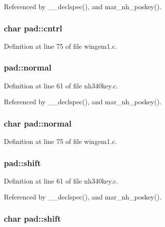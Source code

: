 Referenced by \+\_\+\+\_\+declspec(), and mar\+\_\+nh\+\_\+poskey().

\hypertarget{structpad_a40e6032da3145f7bcf936a79afeb8f43}{
\subsubsection[{cntrl}]{\setlength{\rightskip}{0pt plus 5cm}char pad\+::cntrl}}\label{structpad_a40e6032da3145f7bcf936a79afeb8f43}


Definition at line 75 of file wingem1.\+c.

\hypertarget{structpad_a4cd6384a403104717c1aec3768969e9a}{
\subsubsection[{normal}]{ pad\+::normal}}\label{structpad_a4cd6384a403104717c1aec3768969e9a}


Definition at line 61 of file nh340key.\+c.



Referenced by \+\_\+\+\_\+declspec(), and mar\+\_\+nh\+\_\+poskey().

\hypertarget{structpad_a5b5c28e408e3e882cd7796f2c0aff3dd}{
\subsubsection[{normal}]{\setlength{\rightskip}{0pt plus 5cm}char pad\+::normal}}\label{structpad_a5b5c28e408e3e882cd7796f2c0aff3dd}


Definition at line 75 of file wingem1.\+c.

\hypertarget{structpad_a42a0cc78157ef5c948b92bbf379ab3d4}{
\subsubsection[{shift}]{ pad\+::shift}}\label{structpad_a42a0cc78157ef5c948b92bbf379ab3d4}


Definition at line 61 of file nh340key.\+c.



Referenced by \+\_\+\+\_\+declspec(), and mar\+\_\+nh\+\_\+poskey().

\hypertarget{structpad_a667d36e44c4a56c29a8c248bec5d0c76}{
\subsubsection[{shift}]{\setlength{\rightskip}{0pt plus 5cm}char pad\+::shift}}\label{structpad_a667d36e44c4a56c29a8c248bec5d0c76}


